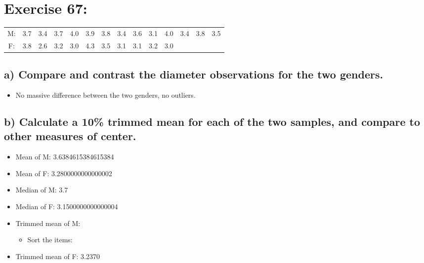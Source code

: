 \newpage
\section{Exercise 67:}

\begin{table}[h!]
    \centering
    \begin{tabular}{cccccccccccccc}
        M: & 3.7 & 3.4 & 3.7 & 4.0 & 3.9 & 3.8 & 3.4 & 3.6 & 3.1 & 4.0 & 3.4 & 3.8 & 3.5 \\
        F: & 3.8 & 2.6 & 3.2 & 3.0 & 4.3 & 3.5 & 3.1 & 3.1 & 3.2 & 3.0
    \end{tabular}
\end{table}


\subsection{a) Compare and contrast the diameter observations for the two genders.}
\begin{itemize}
    \item No massive difference between the two genders, no outliers.
\end{itemize}

\subsection{b) Calculate a 10\% trimmed mean for each of the two samples, and compare to other measures of center.}
\begin{itemize}
    \item Mean of M:  3.6384615384615384
    \item Mean of F:  3.2800000000000002
    \item Median of M:  3.7
    \item Median of F:  3.1500000000000004
    \item Trimmed mean of M: 
    \begin{itemize}
        \item Sort the items: 
    \end{itemize}
    \item Trimmed mean of F:  3.2370
\end{itemize}


